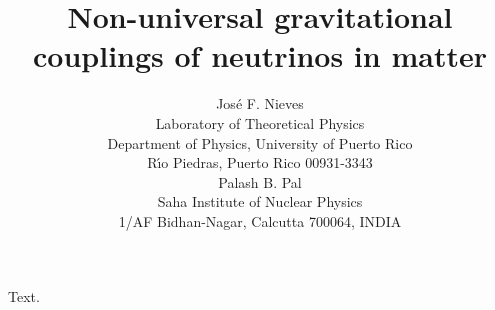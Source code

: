 \documentclass{article}
\title{Non-universal gravitational couplings of neutrinos in matter}
\author{Jos\'e F. Nieves\\
Laboratory of Theoretical Physics\\
Department of Physics, University of Puerto Rico \\
R\'{\i}o Piedras, Puerto Rico 00931-3343 \\[12pt]
Palash B. Pal\\
Saha Institute of Nuclear Physics\\
1/AF Bidhan-Nagar, Calcutta 700064, INDIA
}
\begin{document}
\maketitle
Text.
\end{document}
